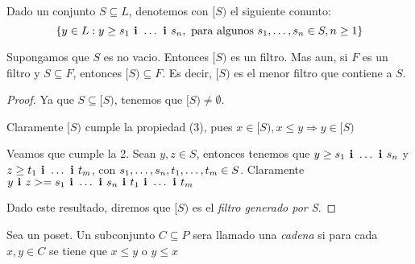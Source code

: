 \begin{definition}
  Dado un conjunto $S \subseteq L$, denotemos con $[S)$ el siguiente conunto:
  $$
  \{y \in L : y \geq \succession[\textbf{ i }]{s}{1}{n}, \text{ para algunos } \succession{s}{1}{n} \in S, n \geq 1\}
  $$
\end{definition}
\begin{lemma}
  Supongamos que $S$ es no vacio. Entonces $[S)$ es un filtro. Mas aun, si $F$ es un filtro y $S \subseteq F$, entonces
  $[S) \subseteq F$. Es decir, $[S)$ es el menor filtro que contiene a $S$.
\end{lemma}
\begin{proof}
  Ya que $S \subseteq [S)$, tenemos que $[S) \neq \emptyset$.
  
  Claramente $[S)$ cumple la propiedad (3), pues $x \in [S), x\leq y \Rightarrow y \in [S)$

  Veamos que cumple la 2. Sean $y, z \in S$, entonces tenemos que $y \geq \succession[\textbf{ i }]{s}{1}{n}$ y
  $z \geq \succession[\textbf{ i }]{t}{1}{m}$, con $\succession{s}{1}{n}, \succession{t}{1}{m} \in S$. Claramente $\infbin{y}{z} >= \infbin{\succession[\textbf{ i }]{s}{1}{n}}{\succession[\textbf{ i }]{t}{1}{m}}$

  Dado este resultado, diremos que $[S)$ es el \emph{filtro generado por S}.
\end{proof}

\begin{definition}
  Sea \poset un poset. Un subconjunto $C \subseteq P$ sera llamado una \emph{cadena} si para cada
  $x, y \in C$ se tiene que $x \leq y$ o $y \leq x$
\end{definition}

